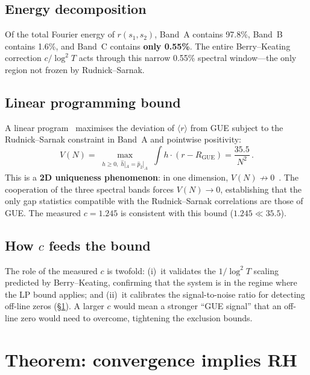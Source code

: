 \documentclass[10pt]{article}
\begin{document}
\subsection{Energy decomposition}

Of the total Fourier energy of $r(s_1,s_2)$, Band~A contains 97.8\%,
Band~B contains 1.6\%, and Band~C contains \textbf{only 0.55\%}.
The entire Berry--Keating correction $c/\log^2 T$ acts through this narrow
0.55\% spectral window---the only region not frozen by Rudnick--Sarnak.

\subsection{Linear programming bound}

A linear program~\cite{alarcon2026e} maximises the deviation of
$\langle r\rangle$ from GUE subject to the Rudnick--Sarnak constraint in
Band~A and pointwise positivity:
\begin{equation}
V(N) = \max_{\substack{h \geq 0,\; \hat{h}|_A = \hat{p}_2|_A}}
\int h \cdot (r - R_{\mathrm{GUE}}) = \frac{35.5}{N^2}\,.
\label{eq:LP}
\end{equation}
This is a \textbf{2D uniqueness phenomenon}: in one dimension, $V(N)
\not\to 0$~\cite{alarcon2026e}. The cooperation of the three spectral bands
forces $V(N) \to 0$, establishing that the only gap statistics compatible
with the Rudnick--Sarnak correlations are those of GUE.
The measured $c = 1.245$ is consistent with this bound ($1.245 \ll 35.5$).

\subsection{How $c$ feeds the bound}

The role of the measured $c$ is twofold:
(i)~it validates the $1/\log^2 T$ scaling predicted by Berry--Keating,
confirming that the system is in the regime where the LP bound applies; and
(ii)~it calibrates the signal-to-noise ratio for detecting off-line zeros
(\S\ref{sec:proof}). A larger $c$ would mean a stronger ``GUE signal'' that
an off-line zero would need to overcome, tightening the exclusion bounds.


\section{Theorem: convergence implies RH}
\label{sec:proof}
\end{document}
